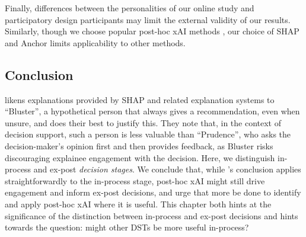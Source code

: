Finally, differences between the personalities of our online study and participatory design participants may limit the external validity of our results. Similarly, though we choose popular post-hoc xAI methods \cite{barocas_hidden_2020,kumar_problems_2020,weerts_human-grounded_2019,ribeiro_nothing_2016}, our choice of SHAP and Anchor limits applicability to other methods.

\subsection{Conclusion}
\textcite{miller_explainable_2023} likens explanations provided by SHAP and related explanation systems to ``Bluster'', a hypothetical person that always gives a recommendation, even when unsure, and does their best to justify this. They note that, in the context of decision support, such a person is less valuable than ``Prudence'', who asks the decision-maker's opinion first and then provides feedback, as Bluster risks discouraging explainee engagement with the decision. Here, we distinguish in-process and ex-post \emph{decision stages}. We conclude that, while \textcite{miller_explainable_2023}'s conclusion applies straightforwardly to the in-process stage, post-hoc xAI might still drive engagement and inform ex-post decisions, and urge that more be done to identify and apply post-hoc xAI where it is useful. This chapter both hints at the significance of the distinction between in-process and ex-post decisions and hints towards the question: might other DSTs be more useful in-process?
